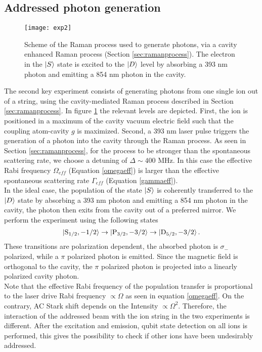 \subsection{Addressed photon generation}
\label{sec:expphoton}
\begin{figure}
\centering
\texttt{[image: exp2]}
\caption{Scheme of the Raman process used to generate photons, via a cavity enhanced Raman process (Section \ref{sec:ramanprocess}). The electron in the $\ket{S}$ state is excited to the $\ket{D}$ level by absorbing a 393 nm photon and emitting a 854 nm photon in the cavity.}
\label{img:sec2}
\end{figure}
The second key experiment consists of generating photons from one single ion out of a string, using the cavity-mediated Raman process described in Section \ref{sec:ramanprocess}. In figure \ref{img:sec2} the relevant levels are depicted. First, the ion is positioned in a maximum of the cavity vacuum electric field such that the coupling atom-cavity $g$ is maximized. Second, a 393 nm laser pulse triggers the generation of a photon into the cavity through the Raman process. As seen in Section \ref{sec:ramanprocess}, for the process to be stronger than the spontaneous scattering rate, we choose a detuning of $\Delta \sim 400$ MHz. In this case the effective Rabi frequency $\Omega_{eff}$ (Equation \eqref{omegaeff}) is larger than the effective spontaneous scattering rate $\Gamma_{eff}$ (Equation \eqref{gammaeff}).\\
In the ideal case, the population of the state $\ket{S}$ is coherently transferred to the $\ket{D}$ state by absorbing a 393 nm photon and emitting a 854 nm photon in the cavity, the photon then exits from the cavity out of a preferred mirror. We perform the experiment using the following states
\begin{equation}
\ket{\text{S}_{1/2},-1/2} \to \ket{\text{P}_{3/2},-3/2} \to \ket{\text{D}_{5/2},-3/2}.
\end{equation}
These transitions are polarization dependent, the absorbed photon is $\sigma_-$ polarized, while a $\pi$ polarized photon is emitted. Since the magnetic field is orthogonal to the cavity, the $\pi$ polarized photon is projected into a linearly polarized cavity photon.\\
Note that the effective Rabi frequency of the population transfer is proportional to the laser drive Rabi frequency $\propto \Omega$ as seen in equation \eqref{omegaeff}. On the contrary, AC Stark shift depends on the Intensity $\propto \Omega^2$. Therefore, the interaction of the addressed beam with the ion string in the two experiments is different. After the excitation and emission, qubit state detection on all ions is performed, this gives the possibility to check if other ions have been undesirably addressed.
